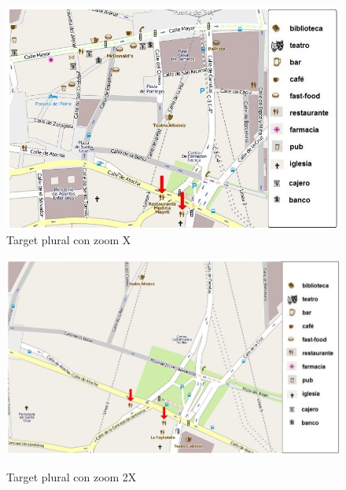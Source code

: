 \begin{figure}[!ht]
\begin{minipage}[b]{0.47\linewidth}
\centering
\includegraphics[width=\textwidth]{images/corpus/mapa10.png}\\[0pt]
\caption{Target plural con zoom X}
\label{pluralx}
\end{minipage}
\begin{minipage}[b]{0.53\linewidth}
\centering
\includegraphics[width=\textwidth]{images/corpus/mapa20.png}\\[0pt]
\caption{Target plural con zoom 2X}
\label{plural2x}
\end{minipage}
\end{figure}
